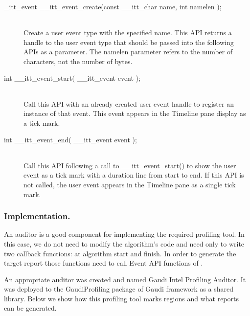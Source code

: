 \documentclass[a4paper]{jpconf}
\begin{document}
\begin{description}
\item[\_itt\_event \_\_itt\_event\_create(const \_\_itt\_char \*name, int namelen );] \hfill \\
Create a user event type with the specified name. This API returns a handle to the user event type that should be 
passed into the following APIs as a parameter. The namelen parameter refers to the number of characters, 
not the number of bytes.

\item[int \_\_itt\_event\_start( \_\_itt\_event event );] \hfill \\
Call this API with an already created user event handle to register an instance of that event. This event appears 
in the Timeline pane display as a tick mark.

\item[int \_\_itt\_event\_end( \_\_itt\_event event );] \hfill \\
Call this API following a call to \_\_itt\_event\_start() to show the user event as a tick mark with a duration line 
from start to end. If this API is not called, the user event appears in the Timeline pane as a single tick mark.
\end{description}

\subsubsection{Implementation.}

An auditor is a good component for implementing the required profiling tool. In this case, we do not need to modify 
the algorithm’s code and need only to write two callback functions: at algorithm start and finish. In order to generate 
the target report those functions need to call Event API functions of \amp.

An appropriate auditor was created and named Gaudi Intel Profiling Auditor. It was deployed to the GaudiProfiling 
package of Gaudi framework as a shared library. Below we show how this profiling tool marks regions and what reports 
can be generated.
\end{document}
